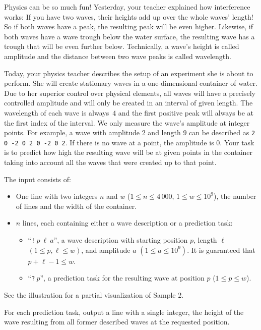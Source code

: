 
%
Physics can be so much fun!
Yesterday, your teacher explained how interference works: If you have two waves, their heights add up over the whole waves' length!
So if both waves have a peak, the resulting peak will be even higher.
Likewise, if both waves have a wave trough below the water surface, the resulting wave has a trough that will be even further below.
Technically, a wave's height is called amplitude and the distance between two wave peaks is called wavelength.

Today, your physics teacher describes the setup of an experiment she is about to perform.
She will create stationary waves in a one-dimensional container of water.
Due to her superior control over physical elements, all waves will have a precisely controlled amplitude and will only be created in an interval of given length.  %
The wavelength of each wave is always~$4$ and the first positive peak will always be at the first index of the interval.
We only measure the wave's amplitude at integer points.
For example, a wave with amplitude $2$ and length $9$ can be described as \texttt{2 0 -2 0 2 0 -2 0 2}.
If there is no wave at a point, the amplitude is $0$.
Your task is to predict how high the resulting wave will be at given points in the container taking into account all the waves that were created up to that point.

\begin{Input}
  The input consists of:
  \begin{itemize}
    \item One line with two integers $n$ and $w$ ($1 \le n \le 4\,000$, $1 \le w \le 10^{9}$), the number of lines and the width of the container.
    \item $n$ lines, each containing either a wave description or a prediction task:
    \begin{itemize}
      \item ``\texttt{!$~p~\ell~a$}'', a wave description with starting position $p$, length $\ell$ $(1 \le p, \ell \le w)$, and amplitude $a$ $(1 \le a \le 10^9)$.
      It is guaranteed that $p+\ell - 1 \le w$.
      \item ``\texttt{?$~p$}'', a prediction task for the resulting wave at position $p$ ($1 \le p \le w$).
    \end{itemize}
  \end{itemize}
  See the illustration for a partial visualization of Sample 2.
\end{Input}

\begin{Output}
  For each prediction task, output a line with a single integer, the height of the wave resulting from all former described waves at the requested position.
\end{Output}
